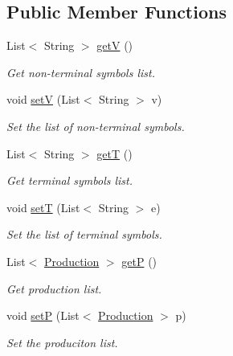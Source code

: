 \subsection*{Public Member Functions}
\begin{DoxyCompactItemize}
\item 
List$<$ String $>$ \hyperlink{interfacecontext_free_1_1grammar_1_1_i_grammar_a4b1bc2134e63051dc37e693294aaeec6}{get\-V} ()
\begin{DoxyCompactList}\small\item\em Get non-\/terminal symbols list. \end{DoxyCompactList}\item 
void \hyperlink{interfacecontext_free_1_1grammar_1_1_i_grammar_ae7bd17123ad7424af06a7da75a6bc745}{set\-V} (List$<$ String $>$ v)
\begin{DoxyCompactList}\small\item\em Set the list of non-\/terminal symbols. \end{DoxyCompactList}\item 
List$<$ String $>$ \hyperlink{interfacecontext_free_1_1grammar_1_1_i_grammar_a996f5e0bed5a6ac469b764f56d420fb1}{get\-T} ()
\begin{DoxyCompactList}\small\item\em Get terminal symbols list. \end{DoxyCompactList}\item 
void \hyperlink{interfacecontext_free_1_1grammar_1_1_i_grammar_a775125de1388036059da1860ae61a100}{set\-T} (List$<$ String $>$ e)
\begin{DoxyCompactList}\small\item\em Set the list of terminal symbols. \end{DoxyCompactList}\item 
List$<$ \hyperlink{classcontext_free_1_1grammar_1_1_production}{Production} $>$ \hyperlink{interfacecontext_free_1_1grammar_1_1_i_grammar_a629ab4dc36a869b93fa239a3fee760f9}{get\-P} ()
\begin{DoxyCompactList}\small\item\em Get production list. \end{DoxyCompactList}\item 
void \hyperlink{interfacecontext_free_1_1grammar_1_1_i_grammar_ac070229e5571e47032b5199c0bf2c354}{set\-P} (List$<$ \hyperlink{classcontext_free_1_1grammar_1_1_production}{Production} $>$ p)
\begin{DoxyCompactList}\small\item\em Set the produciton list. \end{DoxyCompactList}\item 

\end{DoxyCompactItemize}
